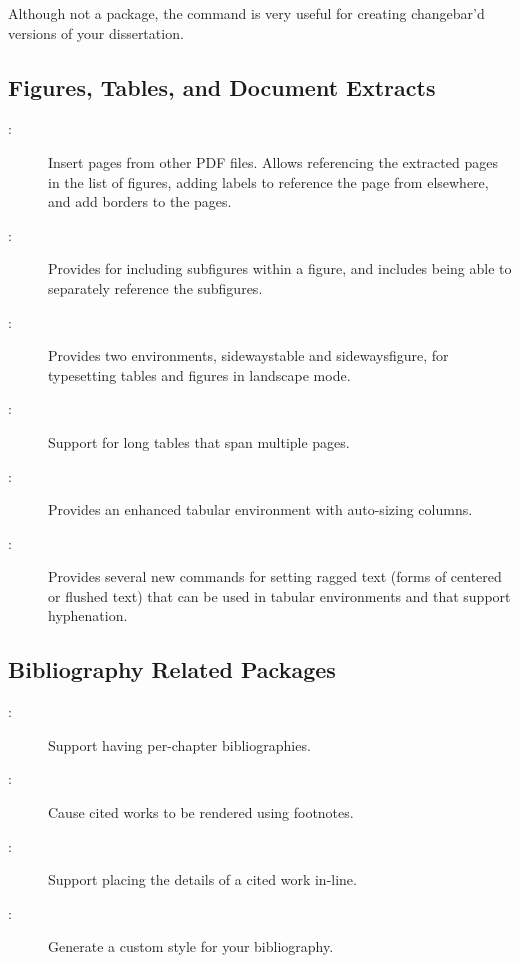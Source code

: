 Although not a package, the
command is very useful for creating changebar'd versions of your
dissertation.


\subsection{Figures, Tables, and Document Extracts}

\begin{description}
\item[:]
    Insert pages from other PDF files.  Allows referencing the extracted
    pages in the list of figures, adding labels to reference the page
    from elsewhere, and add borders to the pages.

\item[:]
    Provides for including subfigures within a figure, and includes
    being able to separately reference the subfigures.

\item[:]
    Provides two environments, sidewaystable and sidewaysfigure,
    for typesetting tables and figures in landscape mode.  

\item[:]
    Support for long tables that span multiple pages.

\item[:]
    Provides an enhanced tabular environment with auto-sizing columns.

\item[:]
    Provides several new commands for setting ragged text (\eg forms
    of centered or flushed text) that can be used in tabular
    environments and that support hyphenation.

\end{description}


\subsection{Bibliography Related Packages}

\begin{description}
\item[:]
    Support having per-chapter bibliographies.

\item[:]
    Cause cited works to be rendered using footnotes.

\item[:] 
    Support placing the details of a cited work in-line.

\item[:]
    Generate a custom style for your bibliography.

\end{description}


